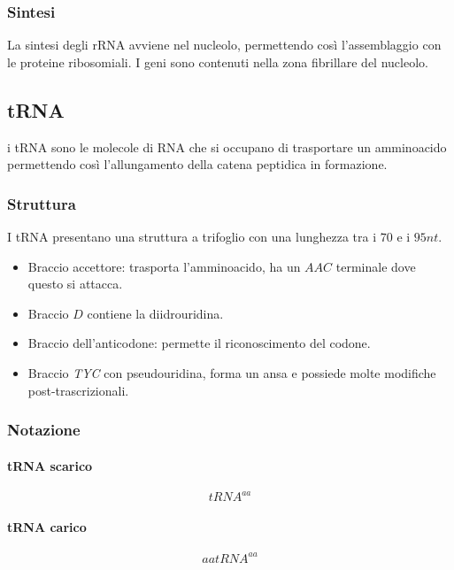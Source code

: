		\subsubsection{Sintesi}
		La sintesi degli rRNA avviene nel nucleolo, permettendo cos\`i l'assemblaggio con le proteine ribosomiali.
		I geni sono contenuti nella zona fibrillare del nucleolo.


	\subsection{tRNA}
	i tRNA sono le molecole di RNA che si occupano di trasportare un amminoacido permettendo cos\`i l'allungamento della catena peptidica in formazione.

		\subsubsection{Struttura}
		I tRNA presentano una struttura a trifoglio con una lunghezza tra i $70$ e i $95nt$.
		\begin{multicols}{2}
			\begin{itemize}
				\item Braccio accettore: trasporta l'amminoacido, ha un $AAC$ terminale dove questo si attacca.
				\item Braccio $D$ contiene la diidrouridina.
				\item Braccio dell'anticodone: permette il riconoscimento del codone.
				\item Braccio \emph{TYC} con pseudouridina, forma un ansa e possiede molte modifiche post-trascrizionali.
			\end{itemize}
		\end{multicols}

		\subsubsection{Notazione}
		
			\paragraph{tRNA scarico}
			\[tRNA^{aa}\]
			
			\paragraph{tRNA carico}
			\[aatRNA^{aa}\]


